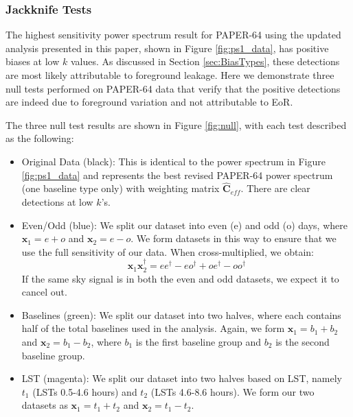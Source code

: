 \documentclass[preprint2,numberedappendix,tighten]{aastex6}  %
\begin{document}
\subsubsection{Jackknife Tests}

The highest sensitivity power spectrum result for PAPER-64 using the updated analysis presented in this paper, shown in 
Figure \ref{fig:ps1_data}, has positive biases at low $k$ values. As discussed in Section \ref{sec:BiasTypes}, these detections 
are most likely attributable to foreground leakage. Here we demonstrate three null tests performed on PAPER-64 data that verify 
that the positive detections are indeed due to foreground variation and not attributable to EoR.

The three null test results are shown in Figure \ref{fig:null}, with each test described as the following:

\begin{itemize}
\item Original Data (black): This is identical to the power spectrum in Figure \ref{fig:ps1_data} and represents the best revised 
PAPER-64 power spectrum (one baseline type only) with weighting matrix $\hat{\textbf{C}}_{eff}$. There are clear detections at 
low $k$'s.
\item Even/Odd (blue): We split our dataset into even (e) and odd (o) days, where $\textbf{x}_{1} = e + o$ and $\textbf{x}_{2} = 
e - o$. We form datasets in this way to ensure that we use the full sensitivity of our data. When cross-multiplied, we obtain:
\begin{equation}
\textbf{x}_{1}\textbf{x}_{2}^{\dagger} = ee^{\dagger} - eo^{\dagger} + oe^{\dagger} - oo^{\dagger}
\end{equation}
If the same sky signal is in both the even and odd datasets, we expect it to cancel out.
\item Baselines (green): We split our dataset into two halves, where each contains half of the total baselines used in the 
analysis. Again, we form $\textbf{x}_{1} = b_{1} + b_{2}$ and $\textbf{x}_{2} = b_{1} - b_{2}$, where $b_{1}$ is the first baseline 
group and $b_{2}$ is the second baseline group.
\item LST (magenta): We split our dataset into two halves based on LST, namely $t_{1}$ (LSTs 0.5-4.6 hours) and $t_{2}$ (LSTs 
4.6-8.6 hours). We form our two datasets as $\textbf{x}_{1} = t_{1} + t_{2}$ and $\textbf{x}_{2} = t_{1} - t_{2}$.
\end{itemize}
\end{document}
